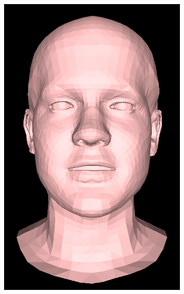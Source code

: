 \begin{figure}[h!]
\begin{subfigure}[b]{0.19\textwidth}
        \includegraphics[width=\textwidth]{figures/gen_sample/00009.png}
    \end{subfigure}
    \begin{subfigure}[b]{0.19\textwidth}

\end{subfigure}
\end{figure}
